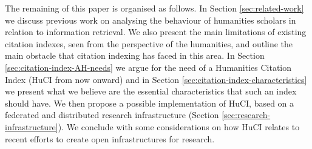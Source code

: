 The remaining of this paper is organised as follows. In Section \ref{sec:related-work} we discuss previous work on analysing the behaviour of humanities scholars in relation to information retrieval. We also present the main limitations of existing citation indexes, seen from the perspective of the humanities, and outline the main obstacle that citation indexing has faced in this area. In Section \ref{sec:citation-index-AH-needs} we argue for the need of a Humanities Citation Index (HuCI from now onward) and in Section \ref{sec:citation-index-characteristics} we present what we believe are the essential characteristics that such an index should have. We then propose a possible implementation of HuCI, based on a federated and distributed research infrastructure (Section \ref{sec:research-infrastructure}). We conclude with some considerations on how HuCI relates to recent efforts to create open infrastructures for research.